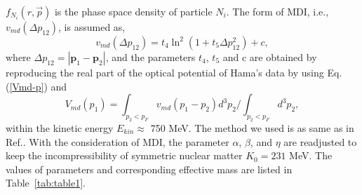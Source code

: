\documentclass[reprint,aps,prc,twocolumn,superscriptaddress]{revtex4-1}
\begin{document}
$f_{N_i}(r,\vec{p})$ is the phase space density of particle $N_i$. The form of MDI, i.e., $v_{md}(\Delta p_{12})$, is assumed as,
\begin{equation}\label{Vmd-p}
	v_{md}(\Delta p_{12})= t_4\ln^2(1+t_5\Delta p_{12}^2)+c,
\end{equation}
where $\Delta p_{12}=|\textbf{p}_1-\textbf{p}_2|$, and the parameters $t_4$, $t_5$  and c are obtained by reproducing the real part of the optical potential of Hama's data by using Eq.(\ref{Vmd-p}) and
\begin{equation}\label{Vmdvmd}
   V_{md}(p_1)=\int_{p_2<p_F}v_{md}(p_1-p_2)d^3p_2/\int_{p_2<p_F}d^3p_2,
\end{equation}
within the kinetic energy $E_{kin}\approx$ 750 MeV. The method we used is as same as in Ref.\cite{Hartnack1994prc}. 
With the consideration of MDI, the parameter $\alpha$, $\beta$, and $\eta$ are readjusted to keep the incompressibility of symmetric nuclear matter $K_0=231$ MeV. The values of parameters and corresponding effective mass are listed in Table~\ref{tab:table1}.
\end{document}
